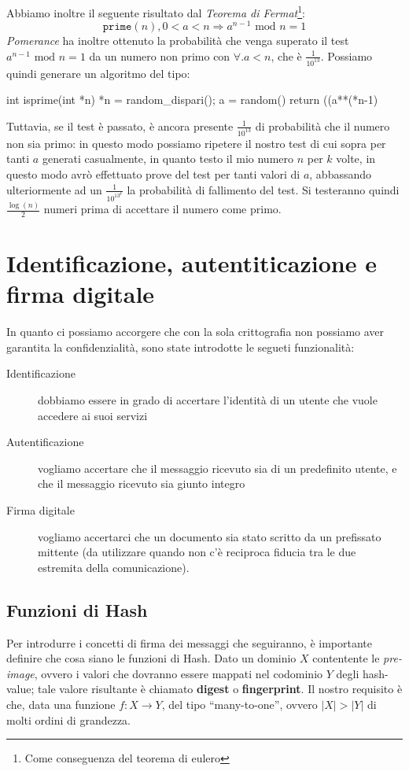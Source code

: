 Abbiamo inoltre il seguente risultato dal \textit{Teorema di Fermat}\footnote{Come
conseguenza del teorema di eulero}:
\[\mathtt{prime}(n),0<a<n\Rightarrow a^{n-1}\text{ mod }n=1\]
\textit{Pomerance} ha inoltre ottenuto la probabilità che venga superato il test
$a^{n-1}\text{ mod }n=1$ da un numero non primo con $\forall. a<n$, che è $\frac{1}{10^{13}}$.
Possiamo quindi generare un algoritmo del tipo:
\begin{pseudoc}
int isprime(int *n) {
  *n = random_dispari();
  a = random() %
  return  ((a**(*n-1) %
}
\end{pseudoc}
Tuttavia, se il test è passato, è ancora presente $\frac{1}{10^{13}}$ di probabilità
che il numero non sia primo: in questo modo possiamo ripetere il nostro test di cui
sopra per tanti $a$ generati casualmente, in quanto testo il mio numero $n$ per
$k$ volte,  in questo modo avrò effettuato prove del test per tanti valori di
$a$, abbassando ulteriormente ad un $\frac{1}{10^{{13}^k}}$ la probabilità di
fallimento del test. Si testeranno quindi $\frac{\log(n)}{2}$ numeri prima di
accettare il numero come primo.

\section{Identificazione, autentiticazione e firma digitale}
In quanto ci possiamo accorgere che con la sola crittografia non possiamo aver
garantita la confidenzialità, sono state introdotte le segueti funzionalità:
\begin{description}
\item[Identificazione] dobbiamo essere in grado di accertare l'identità di un
	utente che vuole accedere ai suoi servizi
\item[Autentificazione] vogliamo accertare che il messaggio ricevuto sia di un
	predefinito utente, e che il messaggio ricevuto sia giunto integro
\item[Firma digitale] vogliamo accertarci che un documento sia stato scritto
	da un prefissato mittente (da utilizzare quando non c'è reciproca fiducia
	tra le due estremita della comunicazione).
\end{description} 

\subsection{Funzioni di Hash}
Per introdurre i concetti di firma dei messaggi che seguiranno, è importante 
definire che cosa siano le funzioni di Hash. Dato un dominio $X$ contentente le
\textit{pre-image}, ovvero i valori che dovranno essere mappati nel codominio
$Y$ degli hash-value; tale valore risultante è chiamato \textbf{digest} o
\textbf{fingerprint}.  Il nostro requisito è che, data una funzione $f:X\to Y$, 
del tipo ``many-to-one'', ovvero $|X|>|Y|$ di molti ordini di grandezza.

